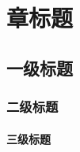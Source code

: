 \documentclass[titlestyle=lralign]
  {course-report}
\begin{document}
\mainmatter
\chapter{章标题}
\section{一级标题}
\subsection{二级标题}
\subsubsection{三级标题}
\clearpage\hbox{}
\end{document}
